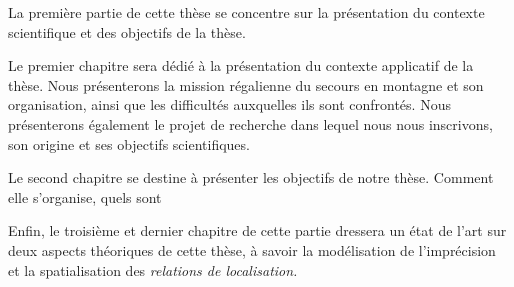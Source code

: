 La première partie de cette thèse se concentre sur la présentation du
contexte scientifique et des objectifs de la thèse.



Le premier chapitre sera dédié à la présentation du contexte
applicatif de la thèse. Nous présenterons la mission régalienne du
secours en montagne et son organisation, ainsi que les difficultés
auxquelles ils sont confrontés.
%
Nous présenterons également le projet de recherche dans lequel nous
nous inscrivons, son origine et ses objectifs scientifiques.

Le second chapitre se destine à présenter les objectifs de notre
thèse. Comment elle s'organise, quels sont

Enfin, le troisième et dernier chapitre de cette partie dressera un
état de l'art sur deux aspects théoriques de cette thèse, à savoir la
modélisation de l'imprécision et la spatialisation des \emph{relations
  de localisation.}

